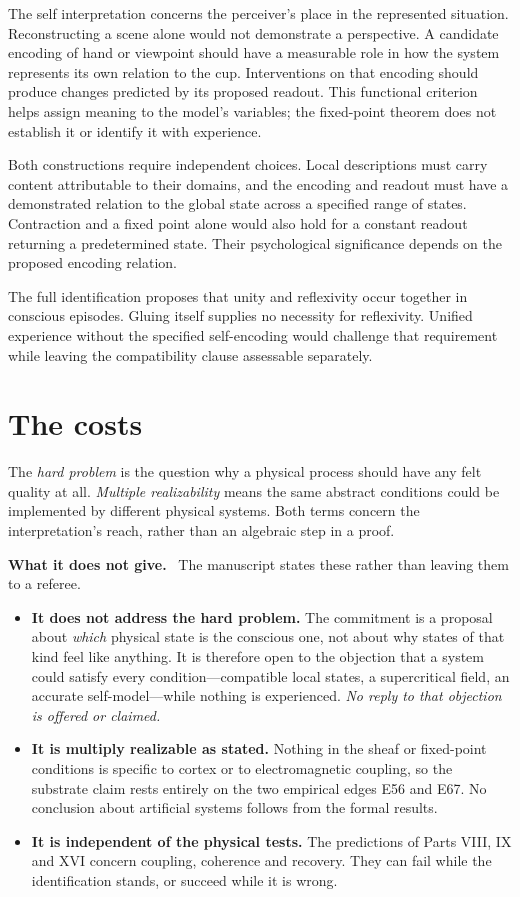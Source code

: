 \documentclass[11pt]{article}
\newcommand{\scope}{\par\smallskip\noindent\textbf{What it does not give.}\ }
\begin{document}
The self interpretation concerns the perceiver's place in the represented
situation. Reconstructing a scene alone would not demonstrate a perspective.
A candidate encoding of hand or viewpoint should have a measurable role in
how the system represents its own relation to the cup. Interventions on that
encoding should produce changes predicted by its proposed readout. This
functional criterion helps assign meaning to the model's variables; the
fixed-point theorem does not establish it or identify it with experience.

Both constructions require independent choices. Local descriptions must carry
content attributable to their domains, and the encoding and readout must have
a demonstrated relation to the global state across a specified range of
states. Contraction and a fixed point alone would also hold for a constant
readout returning a predetermined state. Their psychological significance
depends on the proposed encoding relation.

The full identification proposes that unity and reflexivity occur together in
conscious episodes. Gluing itself supplies no necessity for reflexivity.
Unified experience without the specified self-encoding would challenge that
requirement while leaving the compatibility clause assessable separately.

\section{The costs}

The \emph{hard problem} is the question why a physical process should have
any felt quality at all. \emph{Multiple realizability} means the same abstract
conditions could be implemented by different physical systems. Both terms
concern the interpretation's reach, rather than an algebraic step in a proof.

\scope
The manuscript states these rather than leaving them to a referee.

\begin{itemize}[leftmargin=*]
\item \textbf{It does not address the hard problem.} The commitment is a
proposal about \emph{which} physical state is the conscious one, not about why
states of that kind feel like anything. It is therefore open to the objection
that a system could satisfy every condition---compatible local states, a
supercritical field, an accurate self-model---while nothing is experienced.
\emph{No reply to that objection is offered or claimed.}
\item \textbf{It is multiply realizable as stated.} Nothing in the sheaf or
fixed-point conditions is specific to cortex or to electromagnetic coupling, so
the substrate claim rests entirely on the two empirical edges E56 and E67. No
conclusion about artificial systems follows from the formal results.
\item \textbf{It is independent of the physical tests.} The predictions of
Parts VIII, IX and XVI concern coupling, coherence and recovery. They can fail
while the identification stands, or succeed while it is wrong.
\end{itemize}
\end{document}
